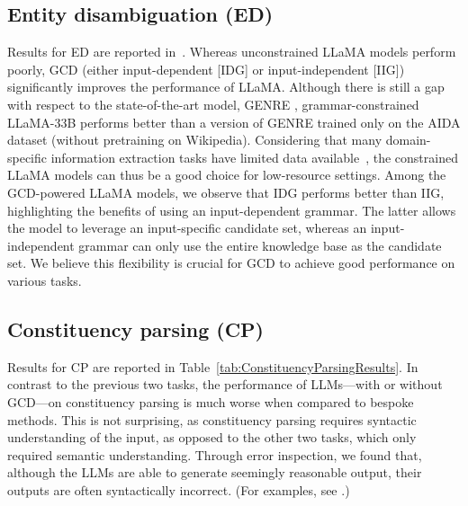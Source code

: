 \subsection{Entity disambiguation (ED)}

Results for ED are reported in~.
Whereas unconstrained LLaMA models perform poorly, GCD (either input-dependent [IDG] or input-independent [IIG]) significantly improves the performance of LLaMA.
%
Although there is still a gap with respect to the state-of-the-art model, GENRE \cite{decao2021autoregressive}, grammar-constrained LLaMA-33B performs better than a version of GENRE trained only on the AIDA dataset (without pretraining on Wikipedia).
Considering that many domain-specific information extraction tasks have limited data available~\cite{dunn2022structured_UCB}, the constrained LLaMA models can thus be a good choice for low-resource settings.
%
Among the GCD-powered LLaMA models, we observe that IDG performs better than IIG, highlighting the benefits of using an input\hyp dependent grammar.
The latter allows the model to leverage an input\hyp specific candidate set, whereas an input\hyp independent grammar can only use the entire knowledge base as the candidate set.
We believe this flexibility is crucial for GCD to achieve good performance on various tasks.



\subsection{Constituency parsing (CP)}\label{subsec:constituency-parsing}



Results for CP are reported in Table~\ref{tab:ConstituencyParsingResults}.
In contrast to the previous two tasks, the performance of LLMs---with or without GCD---on constituency parsing is much worse when compared to bespoke methods.
This is not surprising, as constituency parsing requires syntactic understanding of the input, as opposed to the other two tasks, which only required semantic understanding.
Through error inspection, we found that, although the LLMs are able to generate seemingly reasonable output, their outputs are often syntactically incorrect.
(For examples, see .)

